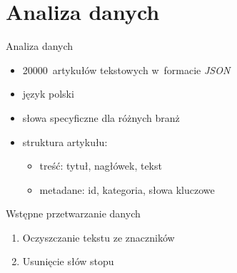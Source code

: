 \documentclass{beamer}
\begin{document}
	\section{Analiza danych}
	\begin{frame}{Analiza danych}
		\begin{itemize}
			\item 20000~artykułów tekstowych w~formacie \textit{JSON}
			\item język polski
			\item słowa specyficzne dla różnych branż
			\item struktura artykułu:
			\begin{itemize}
				\item treść: tytuł, nagłówek, tekst
				\item metadane: id, kategoria, słowa kluczowe
			\end{itemize}
		\end{itemize}
	\end{frame}
	\begin{frame}{Wstępne przetwarzanie danych}
		\begin{enumerate}
			\item Oczyszczanie tekstu ze znaczników
			\item Usunięcie słów stopu
		\end{enumerate}
	\end{frame}
\end{document}
